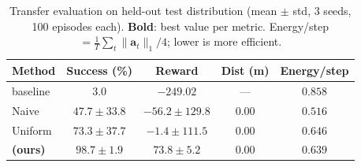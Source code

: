 \begin{table}[!t]
\centering
\caption{Transfer evaluation on held-out test distribution
         (mean $\pm$ std, 3 seeds, 100 episodes each).
         \textbf{Bold}: best value per metric.
         Energy/step $= \frac{1}{T}\sum_t\|\mathbf{a}_t\|_1/4$; lower is more efficient.}
\label{tab:main_results}
\renewcommand{\arraystretch}{1.25}
\setlength{\tabcolsep}{4pt}
\begin{tabular}{lcccc}
\toprule
\textbf{Method}
  & \textbf{Success (\%)}
  & \textbf{Reward}
  & \textbf{Dist (m)}
  & \textbf{Energy/step} \\
\midrule
\PID{} baseline
  & $3.0$
  & $-249.02$
  & ---
  & $0.858$ \\
Naive \SAC{}
  & $47.7 \pm 33.8$
  & $-56.2 \pm 129.8$
  & $0.00$
  & $0.516$ \\
Uniform \DR{}
  & $73.3 \pm 37.7$
  & $-1.4 \pm 111.5$
  & $0.00$
  & $0.646$ \\
\CDR{} \textbf{(ours)}
  & $\mathbf{98.7 \pm 1.9}$
  & $73.8 \pm 5.2$
  & $0.00$
  & $\mathbf{0.639}$ \\
\bottomrule
\end{tabular}
\end{table}